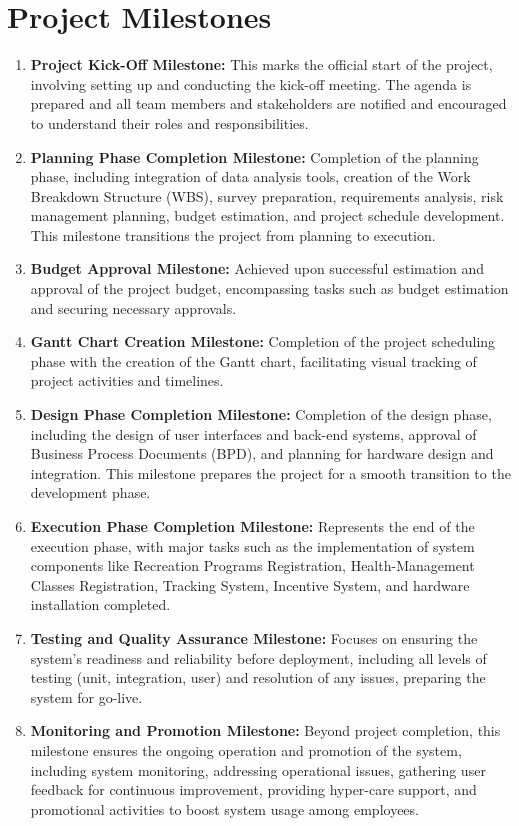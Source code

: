 \section{Project Milestones}
\begin{enumerate}
    \item \textbf{Project Kick-Off Milestone:}
    This marks the official start of the project, involving setting up and conducting the kick-off meeting. The agenda is prepared and all team members and stakeholders are notified and encouraged to understand their roles and responsibilities.
    
    \item \textbf{Planning Phase Completion Milestone:}
    Completion of the planning phase, including integration of data analysis tools, creation of the Work Breakdown Structure (WBS), survey preparation, requirements analysis, risk management planning, budget estimation, and project schedule development. This milestone transitions the project from planning to execution.
    
    \item \textbf{Budget Approval Milestone:}
    Achieved upon successful estimation and approval of the project budget, encompassing tasks such as budget estimation and securing necessary approvals.
    
    \item \textbf{Gantt Chart Creation Milestone:}
    Completion of the project scheduling phase with the creation of the Gantt chart, facilitating visual tracking of project activities and timelines.
    
    \item \textbf{Design Phase Completion Milestone:}
    Completion of the design phase, including the design of user interfaces and back-end systems, approval of Business Process Documents (BPD), and planning for hardware design and integration. This milestone prepares the project for a smooth transition to the development phase.
    
    \item \textbf{Execution Phase Completion Milestone:}
    Represents the end of the execution phase, with major tasks such as the implementation of system components like Recreation Programs Registration, Health-Management Classes Registration, Tracking System, Incentive System, and hardware installation completed.
    
    \item \textbf{Testing and Quality Assurance Milestone:}
    Focuses on ensuring the system's readiness and reliability before deployment, including all levels of testing (unit, integration, user) and resolution of any issues, preparing the system for go-live.
    
    \item \textbf{Monitoring and Promotion Milestone:}
    Beyond project completion, this milestone ensures the ongoing operation and promotion of the system, including system monitoring, addressing operational issues, gathering user feedback for continuous improvement, providing hyper-care support, and promotional activities to boost system usage among employees.
\end{enumerate}

\FloatBarrier
\newpage